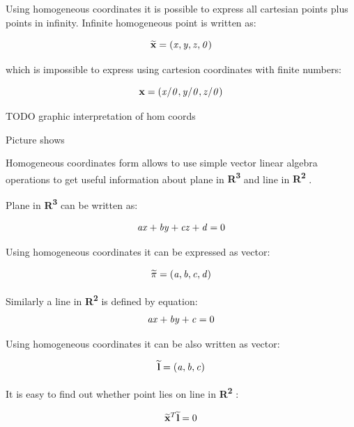 \documentclass[a4paper,12pt]{article}
\newcommand{\evect}[1]{
{\bf #1}
}
\newcommand{\ehvect}[1]{
{\bf \widetilde{#1}}
}
\newcommand{\escal}[1]{
{\it #1}
}
\newcommand{\eucl}[1]{
{\bf R\textsuperscript{#1}}
}
\begin{document}
Using homogeneous coordinates it is possible to express all cartesian points plus points in infinity.
Infinite homogeneous point is written as: 

\begin{equation}
\ehvect{x} = (\escal{x}, \escal{y}, \escal{z}, \escal{0})
\end{equation}

which is impossible to express using cartesion coordinates with finite numbers:

\begin{equation}
\evect{x} = (\escal{x} / \escal{0}, \escal{y} / \escal{0}, \escal{z} / \escal{0})
\end{equation}


TODO graphic interpretation of hom coords 

Picture shows 


Homogeneous coordinates form allows to 
use simple vector linear algebra operations 
to get useful information about plane in \eucl{3} and line in \eucl{2}.

Plane in \eucl{3} can be written as:

\begin{equation}
\escal{a}\escal{x} + \escal{b}\escal{y} + \escal{c}\escal{z} + \escal{d} = 0
\end{equation}

Using homogeneous coordinates it can be expressed as vector:

\begin{equation}
\ehvect{\pi} =  (\escal{a}, \escal{b}, \escal{c}, \escal{d})
\end{equation}


Similarly a line in \eucl{2} is defined by equation:
\begin{equation}
\escal{a}\escal{x} + \escal{b}\escal{y} + \escal{c} = 0
\end{equation}

Using homogeneous coordinates it can be also written as vector:

\begin{equation}
\ehvect{l} =  (\escal{a}, \escal{b}, \escal{c})
\end{equation}

It is easy to find out whether point lies on line in \eucl{2}:

\begin{equation}
\ehvect{x}^{T} \ehvect{l} = 0
\end{equation}
\end{document}
